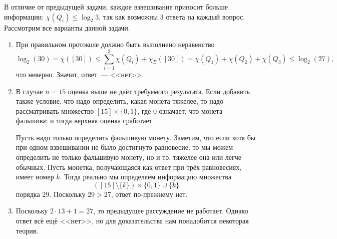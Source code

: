 В отличие от предыдущей задачи, каждое взвешивание приносит больше информации:
$\chi(Q_i) \leq \log_2 3$, так как возможны $3$ ответа на каждый вопрос. Рассмотрим все варианты данной задачи.
\begin{enumerate}
    \item При правильном протоколе должно быть выполнено неравенство
        $$
            \log_2(30) = \chi([30]) \le \sum_{i = 1}^3 \chi(Q_i) + \chi_B([30])
            = \chi(Q_1) + \chi(Q_2) + \chi(Q_3) \le \log_2(27),
        $$
		что неверно. Значит, ответ~--- <<нет>>.
    \item В случае $n = 15 $ оценка выше не даёт требуемого результата. Если добавить также условие, что
        надо определить, какая монета тяжелее, то надо рассматривать множество $[15] \times \{0, 1\}$, где
        $0$ означает, что монета фальшива; и тогда верхняя оценка сработает. 
		
		Пусть надо только определить фальшивую монету. Заметим, что если хотя бы при одном взвешивании не
        было достигнуто равновесие, то мы можем определить не только фальшивую монету, но и то, тяжелее
        она или легче обычных. Пусть монетка, получающаяся как ответ при трёх равновесиях, имеет номер
        $k$. Тогда реально мы определяем информацию множества
		$$([15] \setminus \{k\}) \times \{0,1\} \cup \{k\}$$
        порядка $29$. Поскольку $29 > 27$, ответ по-прежнему нет.
    \item Поскольку $2 \cdot 13 + 1 = 27$, то предыдущее рассуждение не работает. Однако ответ всё ещё
        <<нет>>, но для доказательства нам понадобится некоторая теория.
\end{enumerate}